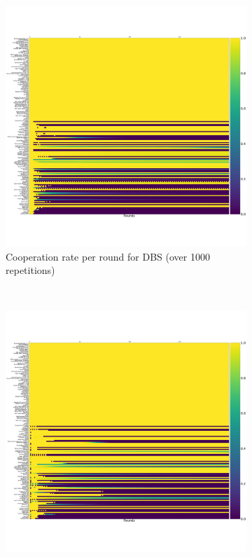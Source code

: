 \documentclass{article}
\begin{document}
\begin{figure}[!hbtp]
    \centering
    \begin{subfigure}[t]{.3\textwidth}
        \centering
        \includegraphics[width=\textwidth]{./assets/cooperation_0_0_1000_DBS_0-75_3_4_3_5_array.pdf}
        \caption{Cooperation rate per round for DBS (over 1000 repetitions)}
    \end{subfigure}%
    ~
    \begin{subfigure}[t]{.3\textwidth}
        \centering
        \includegraphics[width=\textwidth]{./assets/cooperation_0_0_1000_Evolved_ANN_5_Noise_05_array.pdf}

\end{subfigure}
\end{figure}
\end{document}
